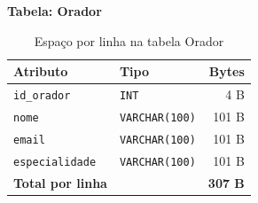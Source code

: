 \documentclass[runningheads]{llncs}
\begin{document}
                \vspace{0.4cm}
                \noindent\begin{minipage}{\textwidth}
                \noindent\textbf{Tabela: Orador}\\[0.2cm]

                \begin{table}[H]
                \centering
                \renewcommand{\arraystretch}{1.3}
                \begin{tabular}{|l|l|r|}
                \hline
                \textbf{Atributo} & \textbf{Tipo} & \textbf{Bytes} \\ \hline
                \texttt{id\_orador}     & \texttt{INT}          & 4 B \\ \hline
                \texttt{nome}           & \texttt{VARCHAR(100)} & 101 B \\ \hline
                \texttt{email}          & \texttt{VARCHAR(100)} & 101 B \\ \hline
                \texttt{especialidade}  & \texttt{VARCHAR(100)} & 101 B \\ \hline
                \textbf{Total por linha} & & \textbf{307 B} \\ \hline
                \end{tabular}
                \vspace{0.2cm}
                \caption{Espaço por linha na tabela Orador} \label{tab:bytes_orador}
                \end{table}
                \end{minipage}
\end{document}
